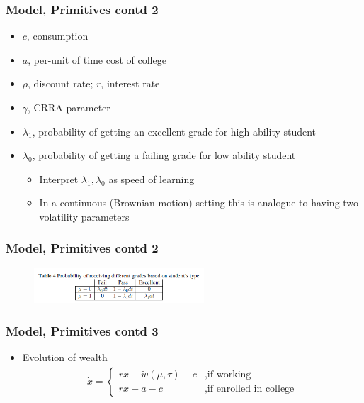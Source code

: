 \begin{frame}
	\frametitle{Model, Primitives contd 2}
		\begin{itemize}
			\item $c$, consumption
			\item $a$, per-unit of time cost of college
			\item $\rho$, discount rate; $r$, interest rate
			\item $\gamma$, CRRA parameter
			\item $\lambda_{1}$, probability of getting an excellent grade for high ability student
			\item $\lambda_{0}$, probability of getting a failing grade for low ability student
				\begin{itemize}
					\item Interpret $\lambda_{1},\lambda_{0}$ as speed of learning
					\item In a continuous (Brownian motion) setting this is analogue to having two volatility parameters
				\end{itemize}
		\end{itemize}
\end{frame}

\begin{frame}
	\frametitle{Model, Primitives contd 2}
		\begin{figure}[H] 
		\caption*{}
		\centering
		\includegraphics[width=2.5in, height=.5in]{Figures/OT/table4.png}
		\end{figure}
\end{frame}

\begin{frame}
	\frametitle{Model, Primitives contd 3}
		\begin{itemize}
			\item Evolution of wealth
				\begin{eqnarray}
					\dot{x} = 
						\begin{cases}
							rx + \tilde{w}(\mu, \tau) - c &, \text{if working} \\
							rx - a - c &, \text{if enrolled in college} \label{eq:x}
						\end{cases}
				\end{eqnarray}
		\end{itemize}
\end{frame}

